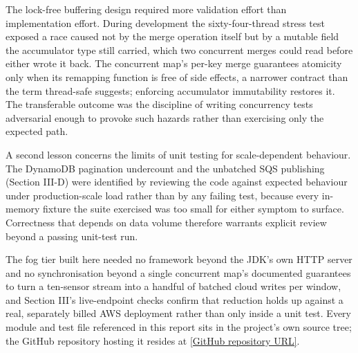 \documentclass[conference]{IEEEtran}
\begin{document}
The lock-free buffering design required more validation effort than implementation effort. During development the sixty-four-thread stress test exposed a race caused not by the merge operation itself but by a mutable field the accumulator type still carried, which two concurrent merges could read before either wrote it back. The concurrent map's per-key merge guarantees atomicity only when its remapping function is free of side effects, a narrower contract than the term thread-safe suggests; enforcing accumulator immutability restores it. The transferable outcome was the discipline of writing concurrency tests adversarial enough to provoke such hazards rather than exercising only the expected path.

A second lesson concerns the limits of unit testing for scale-dependent behaviour. The DynamoDB pagination undercount and the unbatched SQS publishing (Section III-D) were identified by reviewing the code against expected behaviour under production-scale load rather than by any failing test, because every in-memory fixture the suite exercised was too small for either symptom to surface. Correctness that depends on data volume therefore warrants explicit review beyond a passing unit-test run.

The fog tier built here needed no framework beyond the JDK's own HTTP server and no synchronisation beyond a single concurrent map's documented guarantees to turn a ten-sensor stream into a handful of batched cloud writes per window, and Section III's live-endpoint checks confirm that reduction holds up against a real, separately billed AWS deployment rather than only inside a unit test. Every module and test file referenced in this report sits in the project's own source tree; the GitHub repository hosting it resides at \href{[GitHub repository URL]}{[GitHub repository URL]}.



\end{document}
